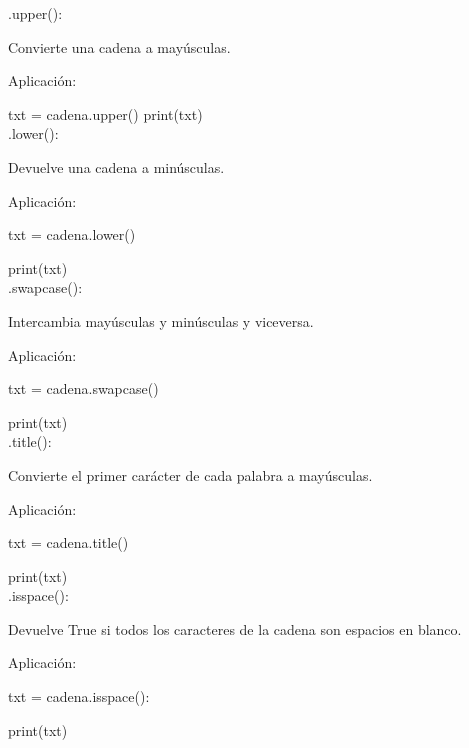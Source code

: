 {{\begin{minipage}{14cm}
{{					
					
					.upper():
					
					{ \color{blue}
						Convierte una cadena a mayúsculas. }	
					
					Aplicación: 
					
					txt = cadena.upper()
					{\color{red!70!blue}print}(txt)\\			
					
					.lower(): 
					
					{ \color{blue}
						Devuelve una cadena a minúsculas. }
					
					Aplicación: 
					
					txt = cadena.lower()
					
					{\color{red!70!blue}print}(txt)\\				 
					
					
					.swapcase(): 
					
					{ \color{blue}	Intercambia mayúsculas y minúsculas y viceversa.}
					
					Aplicación: 
					
					txt = cadena.swapcase()
					
					{\color{red!70!blue}print}(txt)\\
					
					.title(): 
					
					{ \color{blue} Convierte el primer carácter de cada palabra a mayúsculas. }
					
					Aplicación: 
					
					txt = cadena.title()
					
					{\color{red!70!blue}print}(txt)\\
					
					
					.isspace():  
					
					{ \color{blue}Devuelve True si todos los caracteres de la cadena son espacios en blanco.}
					
					Aplicación: 
					
					txt = cadena.isspace():
					
					{\color{red!70!blue}print}(txt)\\
					
					
					
			}}	  
			
		\end{minipage} 
}}












